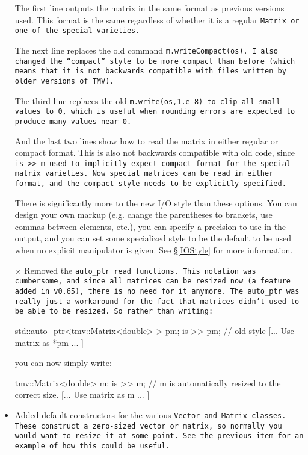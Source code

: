 \begin{itemize}
The first line outputs the matrix in the same format as previous versions used.  This format is the same regardless of whether it is a regular \tt{Matrix} or one of the special varieties.  

The next line replaces the old command \tt{m.writeCompact(os)}.  I also changed the ``compact'' style to be more compact than before (which means that it is not backwards compatible with files written by older versions of TMV).  

The third line replaces the old \tt{m.write(os,1.e-8)} to clip all small values to 0, which is useful when rounding errors are expected to produce many values near 0.  

And the last two lines show how to read the matrix in either regular or compact format.  This is also not backwards compatible with old code, since \tt{is >> m} used to implicitly expect compact format for the special matrix varieties.  Now special matrices can be read in either format, and the compact style needs to be explicitly specified.  

There is significantly more to the new I/O style than these options.  You can design your own markup (e.g. change the parentheses to brackets, use commas between elements, etc.), you can specify a precision to use in the output, and you can set some specialized style to be the default to be used when no explicit manipulator is given.  See \S\ref{IOStyle} for more information.

\item[$\times$]
Removed the \tt{auto_ptr} read functions.  This notation was cumbersome, and since 
all matrices can be resized now (a feature added in v0.65), there is no need for it anymore.
The \tt{auto_ptr} was really just a workaround for the fact that matrices didn't used to be 
able to be resized.  So rather than writing:
\begin{tmvcode}
std::auto_ptr<tmv::Matrix<double> > pm;
is >> pm;  // old style
[... Use matrix as *pm ... ]
\end{tmvcode}
you can now simply write:
\begin{tmvcode}
tmv::Matrix<double> m;
is >> m;   // m is automatically resized to the correct size.
[... Use matrix as m ... ]
\end{tmvcode}

\item
Added default constructors for the various \tt{Vector} and \tt{Matrix} classes.  These construct a zero-sized vector or matrix, so normally you would want to resize it at some point.  See the previous item for an example of how this could be useful.


\end{itemize}
